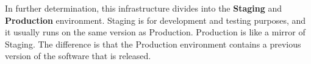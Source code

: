 In further determination, this infrastructure divides into the \textbf{Staging} and \textbf{Production} environment.
Staging is for development and testing purposes, and it usually runs on the same version as Production.
Production is like a mirror of Staging.
The difference is that the Production environment contains a previous version of the software that is released.






%
